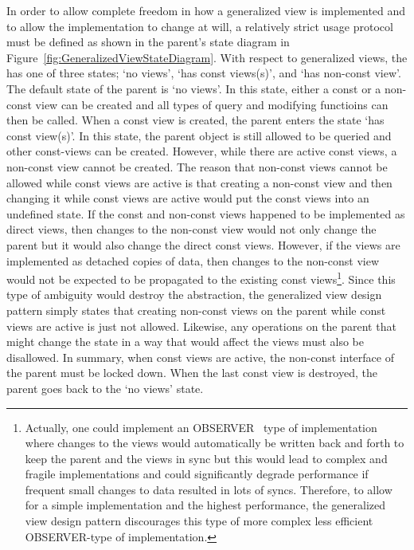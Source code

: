 \documentclass[pdf,ps2pdf,11pt]{SANDreport}
\begin{document}
In order to allow complete freedom in how a generalized view is
implemented and to allow the implementation to change at will, a
relatively strict usage protocol must be defined as shown in the
parent's state diagram in
Figure~\ref{fig:GeneralizedViewStateDiagram}.  With respect to
generalized views, the {} has one of three states; `no
views', `has const views(s)', and `has non-const view'.  The default
state of the parent is `no views'.  In this state, either a const or a
non-const view can be created and all types of query and modifying
functioins can then be called.  When a const view is created, the
parent enters the state `has const view(s)'.  In this state, the
parent object is still allowed to be queried and other const-views can
be created.  However, while there are active const views, a non-const
view cannot be created.  The reason that non-const views cannot be
allowed while const views are active is that creating a non-const view
and then changing it while const views are active would put the const
views into an undefined state.  If the const and non-const views
happened to be implemented as direct views, then changes to the
non-const view would not only change the parent but it would also
change the direct const views.  However, if the views are implemented
as detached copies of data, then changes to the non-const view would
not be expected to be propagated to the existing const
views\footnote{Actually, one could implement an
OBSERVER~\cite{AgileSoftwareDevelopment} type of implementation where
changes to the views would automatically be written back and forth to
keep the parent and the views in sync but this would lead to complex
and fragile implementations and could significantly degrade
performance if frequent small changes to data resulted in lots of
syncs.  Therefore, to allow for a simple implementation and the
highest performance, the generalized view design pattern discourages
this type of more complex less efficient OBSERVER-type of
implementation.}.  Since this type of ambiguity would destroy the
abstraction, the generalized view design pattern simply states that
creating non-const views on the parent while const views are active is
just not allowed.  Likewise, any operations on the parent that might
change the state in a way that would affect the views must also be
disallowed.  In summary, when const views are active, the non-const
interface of the parent must be locked down.  When the last const view
is destroyed, the parent goes back to the `no views' state.
\end{document}

